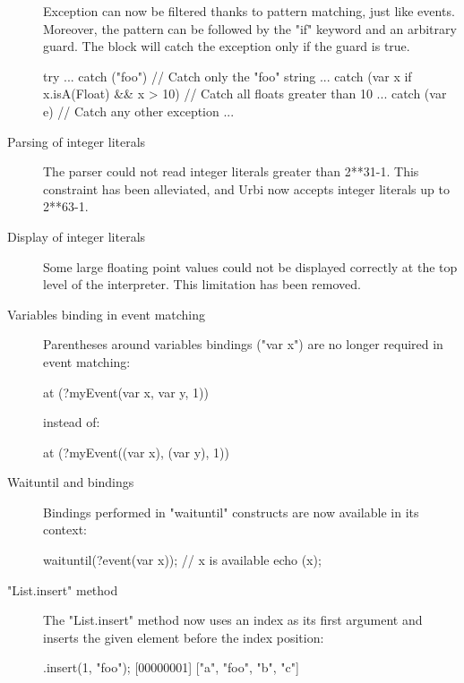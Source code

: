\begin{description}
Exception can now be filtered thanks to pattern matching, just like
events. Moreover, the pattern can be followed by the "if" keyword and
an arbitrary guard. The block will catch the exception only if the
guard is true.

\begin{urbiunchecked}
try
{ ... }
catch ("foo") // Catch only the "foo" string
{ ... }
catch (var x if x.isA(Float) && x > 10) // Catch all floats greater than 10
{ ... }
catch (var e)  // Catch any other exception
{ ... }
\end{urbiunchecked}

\item[Parsing of integer literals] The parser could not read integer
  literals greater than 2**31-1.  This constraint has been alleviated,
  and Urbi now accepts integer literals up to 2**63-1.

\item[Display of integer literals] Some large floating point values
  could not be displayed correctly at the top level of the
  interpreter. This limitation has been removed.

\item[Variables binding in event matching]

Parentheses around variables bindings ("var x") are no longer required
in event matching:

\begin{urbiunchecked}
at (?myEvent(var x, var y, 1))
\end{urbiunchecked}

\noindent
instead of:

\begin{urbiunchecked}
at (?myEvent((var x), (var y), 1))
\end{urbiunchecked}

\item[Waituntil and bindings]

Bindings performed in "waituntil" constructs are now available in its
context:

\begin{urbiunchecked}
waituntil(?event(var x));
// x is available
echo (x);
\end{urbiunchecked}

\item["List.insert" method]

The "List.insert" method now uses an index as its first argument and
inserts the given element before the index position:

\begin{urbiscript}
["a", "b", "c"].insert(1, "foo");
[00000001] ["a", "foo", "b", "c"]
\end{urbiscript}


\end{description}
